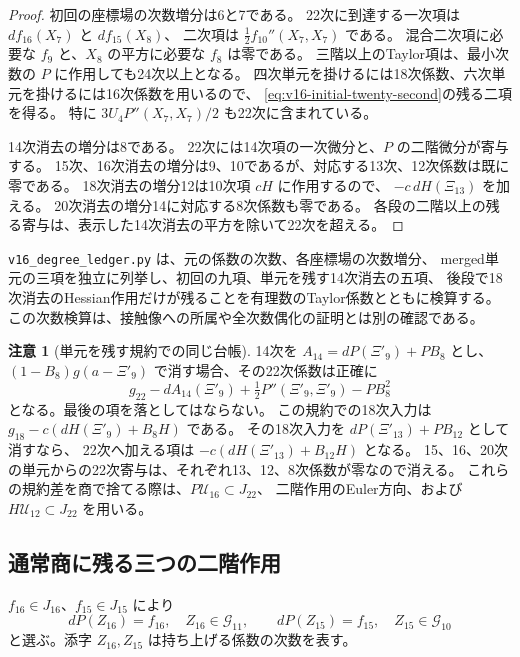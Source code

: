\documentclass[a4paper,11pt]{ltjsarticle}
\theoremstyle{definition}
\newtheorem{remark}[theorem]{注意}
\begin{document}
\begin{proof}
初回の座標場の次数増分は6と7である。
22次に到達する一次項は $df_{16}(X_7)$ と $df_{15}(X_8)$、
二次項は $\tfrac12 f_{10}''(X_7,X_7)$ である。
混合二次項に必要な $f_9$ と、$X_8$ の平方に必要な $f_8$ は零である。
三階以上のTaylor項は、最小次数の $P$ に作用しても24次以上となる。
四次単元を掛けるには18次係数、六次単元を掛けるには16次係数を用いるので、
\eqref{eq:v16-initial-twenty-second}の残る二項を得る。
特に $3U_4P''(X_7,X_7)/2$ も22次に含まれている。

14次消去の増分は8である。
22次には14次項の一次微分と、$P$ の二階微分が寄与する。
15次、16次消去の増分は9、10であるが、対応する13次、12次係数は既に零である。
18次消去の増分12は10次項 $cH$ に作用するので、
$-c\,dH(\Xi_{13})$ を加える。
20次消去の増分14に対応する8次係数も零である。
各段の二階以上の残る寄与は、表示した14次消去の平方を除いて22次を超える。
\end{proof}

\nolinkurl{v16_degree_ledger.py} は、元の係数の次数、各座標場の次数増分、
merged単元の三項を独立に列挙し、初回の九項、単元を残す14次消去の五項、
後段で18次消去のHessian作用だけが残ることを有理数のTaylor係数とともに検算する。
この次数検算は、接触像への所属や全次数偶化の証明とは別の確認である。

\begin{remark}[単元を残す規約での同じ台帳]
14次を $A_{14}=dP(\Xi'_9)+PB_8$ とし、
$(1-B_8)g(a-\Xi'_9)$ で消す場合、その22次係数は正確に
\[
 g_{22}-dA_{14}(\Xi'_9)+\tfrac12P''(\Xi'_9,\Xi'_9)-PB_8^2
\]
となる。最後の項を落としてはならない。
この規約での18次入力は $g_{18}-c(dH(\Xi'_9)+B_8H)$ である。
その18次入力を $dP(\Xi'_{13})+PB_{12}$ として消すなら、
22次へ加える項は $-c(dH(\Xi'_{13})+B_{12}H)$ となる。
15、16、20次の単元からの22次寄与は、それぞれ13、12、8次係数が零なので消える。
これらの規約差を商で捨てる際は、$P\mathcal U_{16}\subset J_{22}$、
二階作用のEuler方向、および $H\mathcal U_{12}\subset J_{22}$ を用いる。
\end{remark}

\subsection{通常商に残る三つの二階作用}

$f_{16}\in J_{16}$、$f_{15}\in J_{15}$ により
\[
 dP(Z_{16})=f_{16},\quad Z_{16}\in\mathcal G_{11},\qquad
 dP(Z_{15})=f_{15},\quad Z_{15}\in\mathcal G_{10}
\]
と選ぶ。添字 $Z_{16},Z_{15}$ は持ち上げる係数の次数を表す。
\end{document}
